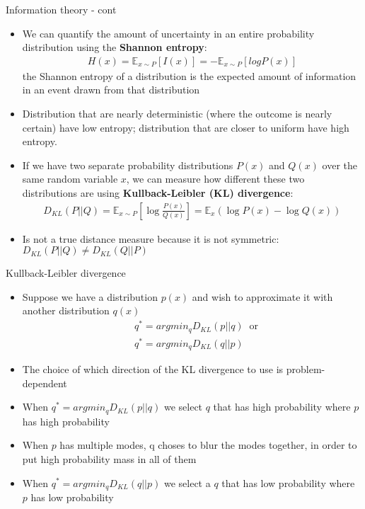 \documentclass[10pt,mathserif]{beamer}
\begin{document}
\begin{frame}{Information theory - cont}
\begin{itemize}
\item We can quantify the amount of uncertainty in an entire probability distribution using the \textbf{Shannon entropy}:
\begin{align}
H(x)= \mathbb{E}_{x\sim P}[I(x)] = - \mathbb{E}_{x\sim P}[log P(x)]
\end{align}
the Shannon entropy of a distribution is the expected amount of information in an event drawn from that distribution
\item Distribution that are nearly deterministic (where the outcome is nearly certain) have low entropy; distribution that are closer to uniform have high entropy.
\item If we have two separate probability distributions $P(x)$ and $Q(x)$ over the same random variable $x$, we can
measure how different these two distributions are using \textbf{Kullback-Leibler (KL) divergence}:
\begin{align}
D_{KL}(P||Q) = \mathbb{E}_{x\sim P}\left[\log \frac{P(x)}{Q(x)} \right]
=\mathbb{E}_{x}\left(\log P(x) - \log Q(x)\right) 
\end{align}
\item Is not a true distance measure because it is not symmetric: $D_{KL}(P||Q) \neq D_{KL}(Q||P)$
\end{itemize}
\end{frame}


\begin{frame}{Kullback-Leibler divergence}
\begin{itemize}
\item Suppose we have a distribution $p(x)$ and wish to approximate it with another distribution $q(x)$
\begin{align}
&q^* = argmin_q D_{KL}(p||q) \;\; \text{or} \\ \nonumber
&q^* = argmin_q D_{KL}(q||p)
\end{align}
\item The choice of which direction of the KL divergence to use is problem-dependent
\item When $q^* = argmin_q D_{KL}(p||q)$ we select $q$ that has high probability where $p$ has high probability
\item When $p$ has multiple modes, q choses to blur the modes together, in order to put high probability mass in all of them
\item When $q^* = argmin_q D_{KL}(q||p)$ we select a $q$ that has low probability where $p$ has low probability
\end{itemize}
\end{frame}
\end{document}
